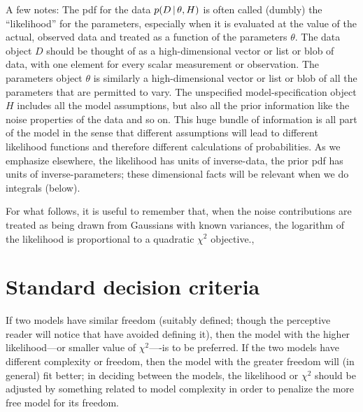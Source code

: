 \documentclass[12pt,twoside]{article}
\newcommand{\data}{D}
\newcommand{\pars}{\theta}
\begin{document}
A few notes: The pdf for the data $p(\data\given\pars, H)$ is often
called (dumbly) the ``likelihood'' for the
parameters, especially when it is evaluated at the value of the
actual, observed data and treated as a function of the parameters
$\pars$.  The data object $\data$ should be thought of as a
high-dimensional vector or list or blob of data, with one element for
every scalar measurement or observation.  The parameters object
$\pars$ is similarly a high-dimensional vector or list or blob of all
the parameters that are permitted to vary.  The unspecified
model-specification object $H$ includes all the model assumptions, but
also all the prior information like the noise properties of the data
and so on.  This huge bundle of information is all part of the model
in the sense that different assumptions will lead to different
likelihood functions and therefore different calculations of
probabilities.  As we emphasize elsewhere, the likelihood has units of inverse-data, the
prior pdf has units of inverse-parameters; these dimensional facts
will be relevant when we do integrals (below).

For what follows, it is useful to remember that, when the noise
contributions are treated as being drawn from Gaussians with known
variances, the logarithm of the likelihood is proportional to a
quadratic $\chi^2$ objective.,  

\section{Standard decision criteria}

If two models have similar freedom (suitably defined; though the
perceptive reader will notice that have avoided defining it), then the model with
the higher likelihood---or smaller value of $\chi^2$----is to be
preferred.  If the two models have different complexity or freedom,
then the model with the greater freedom will (in general) fit better;
in deciding between the models, the likelihood or $\chi^2$ should be
adjusted by something related to model complexity in order to penalize
the more free model for its freedom.
\end{document}
